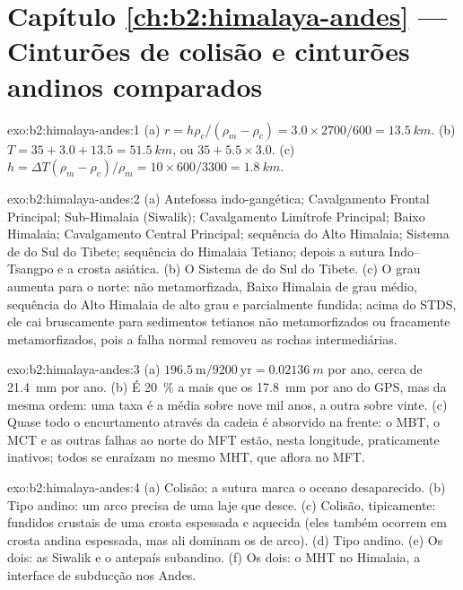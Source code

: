 \section*{Capítulo \ref{ch:b2:himalaya-andes} --- Cinturões de colisão e cinturões andinos comparados}

\begin{solution}{exo:b2:himalaya-andes:1}
(a) $r = h\rho_c/(\rho_m - \rho_c) = 3.0\times2700/600 = \qty{13.5}{km}$. (b) $T = 35 + 3.0 +
13.5 = \qty{51.5}{km}$, ou $35 + 5.5\times3.0$. (c) $h = \Delta T(\rho_m - \rho_c)/\rho_m =
10\times600/3300 = \qty{1.8}{km}$.
\end{solution}

\begin{solution}{exo:b2:himalaya-andes:2}
(a) Antefossa indo-gangética; Cavalgamento Frontal Principal; Sub-Himalaia (Siwalik); Cavalgamento
Limítrofe Principal; Baixo Himalaia; Cavalgamento Central Principal; sequência do Alto Himalaia; Sistema de
 do Sul do Tibete; sequência do Himalaia Tetiano; depois a sutura Indo--Tsangpo e a crosta
asiática. (b) O Sistema de  do Sul do Tibete. (c) O grau aumenta para o norte: 
não metamorfizada, Baixo Himalaia de grau médio, sequência do Alto Himalaia de alto grau e parcialmente
fundida; acima do STDS, ele cai bruscamente para sedimentos tetianos não metamorfizados ou fracamente
metamorfizados, pois a falha normal removeu as rochas intermediárias.
\end{solution}

\begin{solution}{exo:b2:himalaya-andes:3}
(a) $196.5\ \text{m}/9200\ \text{yr} = \qty{0.02136}{m}$ por ano, cerca de \qty{21.4}{mm} por ano.
(b) É \qty{20}{\percent} a mais que os \qty{17.8}{mm} por ano do GPS, mas da mesma ordem:
uma taxa é a média sobre nove mil anos, a outra sobre vinte.
(c) Quase todo o encurtamento através da cadeia é absorvido na frente: o MBT, o MCT e
as outras falhas ao norte do MFT estão, nesta longitude, praticamente inativos; todos se enraízam
no mesmo MHT, que aflora no MFT.
\end{solution}

\begin{solution}{exo:b2:himalaya-andes:4}
(a) Colisão: a sutura marca o oceano desaparecido. (b) Tipo andino: um arco precisa de uma laje
que desce. (c) Colisão, tipicamente: fundidos crustais de uma crosta espessada e aquecida (eles também
ocorrem em crosta andina espessada, mas ali dominam os  de arco). (d) Tipo andino.
(e) Os dois: as Siwalik e o antepaís subandino. (f) Os dois: o MHT no Himalaia, a
interface de subducção nos Andes.
\end{solution}

